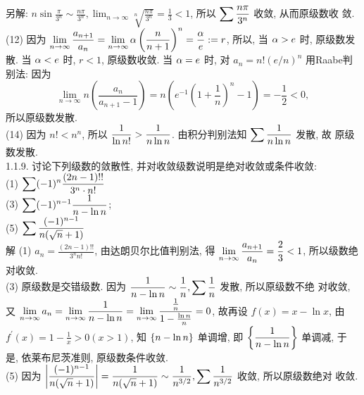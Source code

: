 \documentclass[a4paper,11pt,UTF8]{article}
\begin{document}
另解: $n \sin \frac{\pi}{3^n} \sim \frac{n \pi}{3^n}, \lim _{n \rightarrow \infty} \sqrt[n]{\frac{n \pi}{3^n}}=\frac{1}{3}<1$, 所以 $\displaystyle \displaystyle \displaystyle \sum \frac{n \pi}{3^n}$ 收敛, 从而原级数收 敛.\\
(12) 因为 $\displaystyle \displaystyle \displaystyle \lim _{n \rightarrow \infty} \frac{a_{n+1}}{a_n}=\lim _{n \rightarrow \infty} \alpha\left(\frac{n}{n+1}\right)^n=\frac{\alpha}{e}:=r$, 所以, 当 $\displaystyle \displaystyle \displaystyle \alpha>e$ 时, 原级数发散. 当 $\displaystyle \displaystyle \displaystyle \alpha<e$ 时, $r<1$, 原级数收敛. 当 $\displaystyle \displaystyle \displaystyle \alpha=e$ 时, 对 $a_n=n !(e / n)^n$ 用Raabe判别法: 因为
$$
\lim _{n \rightarrow \infty} n\left(\frac{a_n}{a_{n+1}-1}\right)=n\left(e^{-1}\left(1+\frac{1}{n}\right)^n-1\right)=-\frac{1}{2}<0,
$$
所以原级数发散.\\
(14) 因为 $n !<n^n$, 所以 $\displaystyle \displaystyle \displaystyle \frac{1}{\ln n !}>\frac{1}{n \ln n}$. 由积分判别法知 $\displaystyle \displaystyle \displaystyle \sum \frac{1}{n \ln n}$ 发散, 故 原级数发散.\\
1.1.9. 讨论下列级数的敛散性, 并对收敛级数说明是绝对收敛或条件收敛:\\
(1) $\displaystyle \displaystyle \displaystyle \sum(-1)^n \frac{(2 n-1) ! !}{3^n \cdot n !}$\\
(3) $\displaystyle \displaystyle \displaystyle \sum(-1)^{n-1} \frac{1}{n-\ln n}$;\\
(5) $\displaystyle \displaystyle \displaystyle \sum \frac{(-1)^{n-1}}{n(\sqrt{n}+1)}$\\
解 (1) $a_n=\frac{(2 n-1) ! !}{3^n n !}$, 由达朗贝尔比值判别法, 得 $\displaystyle \displaystyle \displaystyle \lim _{n \rightarrow \infty} \frac{a_{n+1}}{a_n}=\frac{2}{3}<1$, 所以级数绝对收敛.\\
(3) 原级数是交错级数. 因为 $\displaystyle \displaystyle \displaystyle \frac{1}{n-\ln n} \sim \frac{1}{n}, \sum \frac{1}{n}$ 发散, 所以原级数不绝 对收敛, 又 $\displaystyle \displaystyle \displaystyle \lim _{n \rightarrow \infty} a_n=\lim _{n \rightarrow \infty} \frac{1}{n-\ln n}=\lim _{n \rightarrow \infty} \frac{\frac{1}{n}}{1-\frac{\ln n}{n}}=0$, 故再设 $\displaystyle f(x)=x-\ln x$, 由 $\displaystyle f^{\prime}(x)=1-\frac{1}{x}>0(x>1)$, 知 $\displaystyle \displaystyle \displaystyle \{n-\ln n\}$ 单调增, 即 $\displaystyle \displaystyle \displaystyle \left\{\frac{1}{n-\ln n}\right\}$ 单调减, 于 是, 依莱布尼茨准则, 原级数条件收敛.\\
(5) 因为 $\displaystyle \displaystyle \displaystyle \left|\frac{(-1)^{n-1}}{n(\sqrt{n}+1)}\right|=\frac{1}{n(\sqrt{n}+1)} \sim \frac{1}{n^{3 / 2}}, \sum \frac{1}{n^{3 / 2}}$ 收敛, 所以原级数绝对 收敛.\\
\end{document}
